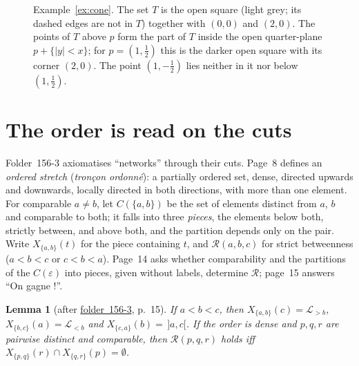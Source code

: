 \documentclass[11pt,a4paper]{amsart}
\newtheorem{lemma}[theorem]{Lemma}
\theoremstyle{definition}
\theoremstyle{remark}
\newcommand{\cL}{\mathcal L}
\newcommand{\cR}{\mathcal R}
\newcommand{\fac}[1]{\href{https://grothendieck.umontpellier.fr/#1.pdf}{folder~#1}}
\begin{document}
\begin{figure}[ht]
\centering
{}
\caption{Example~\ref{ex:cone}. The set $T$ is the open square (light grey; its dashed edges are not in $T$) together with $(0,0)$ and $(2,0)$. The points of $T$ above $p$ form the part of $T$ inside the open quarter-plane $p + \{|y| < x\}$; for $p = (1, \frac12)$ this is the darker open square with its corner $(2,0)$. The point $(1, -\frac12)$ lies neither in it nor below $(1, \frac12)$.}\label{fig:cone}
\end{figure}

\section{The order is read on the cuts}\label{sec:cuts}

Folder~156-3 axiomatises ``networks'' through their cuts. Page~8 defines an \emph{ordered stretch} (\emph{tronçon ordonné}): a partially ordered set, dense, directed upwards and downwards, locally directed in both directions, with more than one element. For comparable $a \ne b$, let $C(\{a, b\})$ be the set of elements distinct from $a$, $b$ and comparable to both; it falls into three \emph{pieces}, the elements below both, strictly between, and above both, and the partition depends only on the pair. Write $X_{\{a,b\}}(t)$ for the piece containing $t$, and $\cR(a, b, c)$ for strict betweenness ($a < b < c$ or $c < b < a$). Page~14 asks whether comparability and the partitions of the $C(\varepsilon)$ into pieces, given without labels, determine $\cR$; page~15 answers ``On gagne !''.

\begin{lemma}[after \fac{156-3}, p.~15]\label{lem:pieces}
If $a < b < c$, then $X_{\{a,b\}}(c) = \cL_{>b}$, $X_{\{b,c\}}(a) = \cL_{<b}$ and $X_{\{c,a\}}(b) = \,]a, c[$. If the order is dense and $p, q, r$ are pairwise distinct and comparable, then $\cR(p, q, r)$ holds iff $X_{\{p,q\}}(r) \cap X_{\{q,r\}}(p) = \emptyset$.
\end{lemma}
\end{document}
